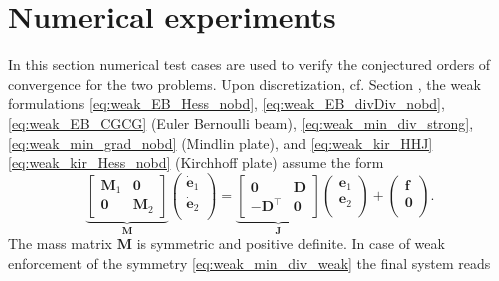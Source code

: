 \section{Numerical experiments}
\label{sec:numerics_mixed}
In this section numerical test cases are used to verify the conjectured orders of convergence for the two problems. Upon discretization, cf. Section , the weak formulations \eqref{eq:weak_EB_Hess_nobd}, \eqref{eq:weak_EB_divDiv_nobd}, \eqref{eq:weak_EB_CGCG} (Euler Bernoulli beam), \eqref{eq:weak_min_div_strong}, \eqref{eq:weak_min_grad_nobd} (Mindlin plate), and \eqref{eq:weak_kir_HHJ} \eqref{eq:weak_kir_Hess_nobd} (Kirchhoff plate) assume the form 
\begin{equation*}
\underbrace{
	\begin{bmatrix}
	\mathbf{M}_1 & \mathbf{0} \\
	\mathbf{0} & \mathbf{M}_2
	\end{bmatrix}}_{\mathbf{M}}
\begin{pmatrix}
\dot{\mathbf{e}}_1 \\
\dot{\mathbf{e}}_2 \\
\end{pmatrix} = 
\underbrace{
	\begin{bmatrix}
	\mathbf{0} & \mathbf{D} \\
	-\mathbf{D}^\top & \mathbf{0}
	\end{bmatrix}}_{\mathbf{J}}
\begin{pmatrix}
{\mathbf{e}}_1 \\
{\mathbf{e}}_2 \\
\end{pmatrix} + 
\begin{pmatrix}
\mathbf{f} \\
\mathbf{0} \\
\end{pmatrix}. 
\end{equation*}
The mass matrix $\mathbf{M}$ is symmetric and positive definite. In case of weak enforcement of the symmetry \eqref{eq:weak_min_div_weak} the final system reads
